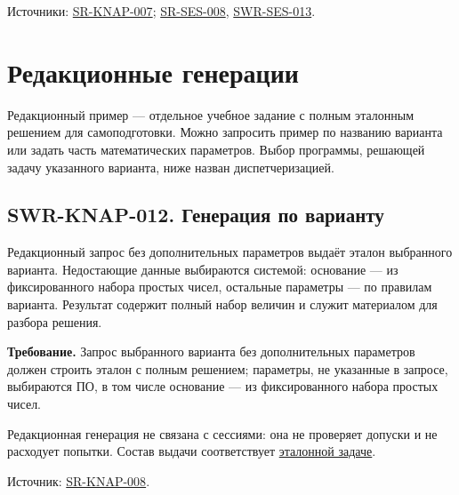\documentclass[12pt,a4paper]{article}
\begin{document}
Источники: {\href{../04\_Системные\_требования/DOC-05\_Системные\_требования.pdf\#sr-knap-007}{SR-KNAP-007}}; {\href{../04\_Системные\_требования/DOC-05\_Системные\_требования.pdf\#sr-ses-008}{SR-SES-008}}, {\href{DOC-06.2\_Сессии\_задач\_и\_планировщик.pdf\#swr-ses-013}{SWR-SES-013}}.

\section{Редакционные генерации}\label{5-ux440ux435ux434ux430ux43aux446ux438ux43eux43dux43dux44bux435-ux433ux435ux43dux435ux440ux430ux446ux438ux438}

\hypertarget{5-редакционные-генерации}{}

Редакционный пример --- отдельное учебное задание с полным эталонным решением для самоподготовки. Можно запросить пример по названию варианта или задать часть математических параметров. Выбор программы, решающей задачу указанного варианта, ниже назван диспетчеризацией.

\subsection{SWR-KNAP-012. Генерация по варианту}\label{swr-knap-012-ux433ux435ux43dux435ux440ux430ux446ux438ux44f-ux43fux43e-ux432ux430ux440ux438ux430ux43dux442ux443}

\hypertarget{swr-knap-012-генерация-по-варианту}{}

\hypertarget{swr-knap-012}{}

Редакционный запрос без дополнительных параметров выдаёт эталон выбранного варианта. Недостающие данные выбираются системой: основание --- из фиксированного набора простых чисел, остальные параметры --- по правилам варианта. Результат содержит полный набор величин и служит материалом для разбора решения.

\textbf{Требование.} Запрос выбранного варианта без дополнительных параметров должен строить эталон с полным решением; параметры, не указанные в запросе, выбираются ПО, в том числе основание --- из фиксированного набора простых чисел.

Редакционная генерация не связана с сессиями: она не проверяет допуски и не расходует попытки. Состав выдачи соответствует {\href{../04\_Системные\_требования/DOC-05\_Системные\_требования.pdf\#sr-knap-008-редакционная-задача-по-варианту}{эталонной задаче}}.

Источник: {\href{../04\_Системные\_требования/DOC-05\_Системные\_требования.pdf\#sr-knap-008}{SR-KNAP-008}}.
\end{document}

